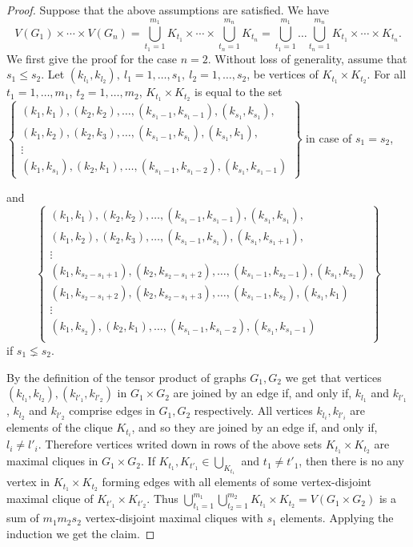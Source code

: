 \documentclass[12pt,a4paper]{article}
\theoremstyle{definition}
\begin{document}
\begin{proof}
Suppose that the above assumptions are satisfied. 
We have $$V(G_1)\times\cdots\times V(G_n)=
\bigcup_{t_1=1}^{m_1}K_{t_1}\times\cdots\times \bigcup_{t_n=1}^{m_n}K_{t_n}=\bigcup_{t_1=1}^{m_1}\ldots
\bigcup_{t_n=1}^{m_n}K_{t_1}\times\cdots\times K_{t_n}.$$
We first give the proof for the case $n=2$. Without loss of generality, assume that $s_1\leqslant s_2.$ 
Let $(k_{l_1}, k_{l_2}),\ l_1=1, \ldots, s_1,\ l_2=1, \ldots, s_2$, be  vertices of $K_{t_1}\times K_{t_2}$. 
For all ${t_1}=1,\ldots, m_1$, ${t_2}=1,\ldots, m_2$, $K_{t_1}\times K_{t_2}$ is equal to the set\newline\\
$\left\{\begin{array}{cclr}
(k_1, k_1), (k_2, k_2), \ldots, (k_{s_1-1}, k_{s_1-1}), (k_{s_1}, k_{s_1}),\\ (k_1, k_2), (k_2, k_3), \ldots, (k_{s_1-1}, k_{s_1}), (k_{s_1}, k_{1}),\\ 
\vdots\\
(k_1, k_{s_1}), (k_2, k_1), \ldots, (k_{s_1-1}, k_{s_1-2}), (k_{s_1}, k_{s_1-1})
\end{array}\right\} $
in case of $s_1=s_2$,\break

and 
$$\left\{\begin{array}{cclr}
(k_1, k_1), (k_2, k_2), \ldots, (k_{s_1-1}, k_{s_1-1}), (k_{s_1}, k_{s_1}),\\ 
(k_1, k_2), (k_2, k_3), \ldots, (k_{s_1-1}, k_{s_1}), (k_{s_1}, k_{s_1+1}),\\ 
\vdots\\
(k_1, k_{s_2-s_1+1}), (k_2, k_{s_2-s_1+2}), \ldots, (k_{s_1-1}, k_{s_2-1}), (k_{s_1}, k_{s_2})\\
(k_1, k_{s_2-s_1+2}), (k_2, k_{s_2-s_1+3}), \ldots, (k_{s_1-1}, k_{s_2}), (k_{s_1}, k_{1})\\
\vdots\\
(k_1, k_{s_2}), (k_2, k_1), \ldots, (k_{s_1-1}, k_{s_1-2}), (k_{s_1}, k_{s_1-1})\\
\end{array}\right\}$$
if $s_1\lneq s_2$. \newline

By the definition of the tensor product of graphs $G_1, G_2$ we get that vertices 
$(k_{l_1}, k_{l_2}), (k_{l'_1}, k_{l'_2})$ in $G_1\times G_2$ are joined by an edge if, and only if, $k_{l_1}$ and $k_{l'_1}$, $k_{l_2}$ and $k_{l'_2}$ comprise edges in $G_1, G_2$ respectively.
All vertices $k_{l_i}, k_{l'_i}$ are elements of the clique $K_{t_i}$, and so they are joined by an edge if, and only if, $l_i\neq l'_i.$
Therefore vertices writed down in rows of the above sets $K_{t_1}\times K_{t_2}$ are maximal cliques in $G_1\times G_2$.
If $K_{t_1}, K_{t'_1}\in \bigcup_{K_{t_1}}$ and $t_1\neq t'_1$, then there is no any vertex in $K_{t_1}\times K_{t_2}$ forming edges with all elements of some vertex-disjoint maximal clique of $K_{t'_1}\times K_{t'_2}$.\newline
Thus $\bigcup_{t_1=1}^{m_1}\bigcup_{t_2=1}^{m_2}K_{t_1}\times K_{t_2}=V(G_1\times G_2)$ is a sum of $m_1m_2s_2$ vertex-disjoint maximal cliques with $s_1$ elements.\newline 
Applying the induction we get the claim.
\end{proof}
\end{document}
